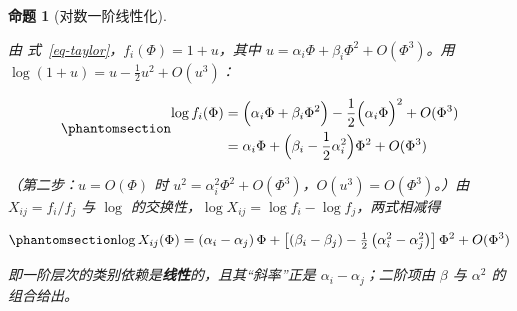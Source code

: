 \documentclass[
  chinese,
  a4paper,
  UTF8,
  12pt,
  oneside,
  openany]{ctexbook}
\theoremstyle{plain}
\theoremstyle{plain}
\theoremstyle{plain}
\newtheorem{proposition}{命题}[chapter]
\theoremstyle{definition}
\theoremstyle{plain}
\theoremstyle{plain}
\theoremstyle{remark}
\begin{document}
\begin{proposition}[对数一阶线性化]\protect\hypertarget{prp-log-linear}{}\label{prp-log-linear}

由 式~\ref{eq-taylor}，\(f_i(\Phi)=1+u\)，其中
\(u=\alpha_i\Phi+\beta_i\Phi^{2}+O(\Phi^{3})\)。用
\(\log(1+u)=u-\tfrac{1}{2}u^{2}+O(u^{3})\)：

\begin{equation}\protect\phantomsection\label{eq-log}{
\begin{aligned}
\log f_i(\Phi)
&=\Bigl(\alpha_i\Phi+\beta_i\Phi^{2}\Bigr)-\frac{1}{2}\Bigl(\alpha_i\Phi\Bigr)^{2}+O(\Phi^{3})\\
&=\alpha_i\Phi+\Bigl(\beta_i-\frac{1}{2}\alpha_i^{2}\Bigr)\Phi^{2}+O(\Phi^{3})
\end{aligned}
}\end{equation}

（第二步：\(u=O(\Phi)\) 时
\(u^{2}=\alpha_i^{2}\Phi^{2}+O(\Phi^{3})\)，\(O(u^{3})=O(\Phi^{3})\)。）由
\(X_{ij}=f_i/f_j\) 与 \(\log\)
的交换性，\(\log X_{ij}=\log f_i-\log f_j\)，两式相减得

\begin{equation}\protect\phantomsection\label{eq-log-X}{
\log X_{ij}(\Phi) = \left(\alpha_i-\alpha_j\right)\Phi + \left[\left(\beta_i-\beta_j\right)-\tfrac{1}{2}\left(\alpha_i^{2}-\alpha_j^{2}\right)\right]\Phi^{2} + O(\Phi^{3})
}\end{equation}

即一阶层次的类别依赖是\textbf{线性}的，且其``斜率''正是
\(\alpha_i-\alpha_j\)；二阶项由 \(\beta\) 与 \(\alpha^{2}\) 的组合给出。

\end{proposition}
\end{document}
